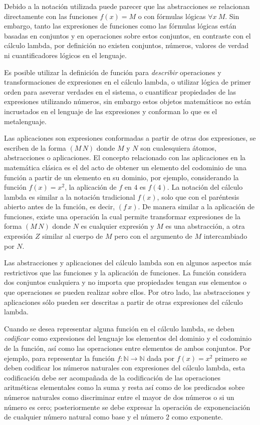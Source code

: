 Debido a la notación utilizada puede parecer que las abstracciones se relacionan directamente con las funciones \( f(x)=M \) o con fórmulas lógicas \( \forall x\ M \). Sin embargo, tanto las expresiones de funciones como las fórmulas lógicas están basadas en conjuntos y en operaciones sobre estos conjuntos, en contraste con el cálculo lambda, por definición no existen conjuntos, números, valores de verdad ni cuantificadores lógicos en el lenguaje.

Es posible utilizar la definición de función para \emph{describir} operaciones y transformaciones de expresiones en el cálculo lambda, o utilizar lógica de primer orden para aseverar verdades en el sistema, o cuantificar propiedades de las expresiones utilizando números, sin embargo estos objetos matemáticos no están incrustados en el lenguaje de las expresiones y conforman lo que es el metalenguaje.

Las aplicaciones son expresiones conformadas a partir de otras dos expresiones, se escriben de la forma \( (M\, N) \) donde \( M \) y \( N \) son cualesquiera átomos, abstracciones o aplicaciones. El concepto relacionado con las aplicaciones en la matemática clásica es el del acto de obtener un elemento del codominio de una función a partir de un elemento en su dominio, por ejemplo, considerando la función \( f(x)=x^{2} \), la aplicación de \( f \) en \( 4 \) es \( f(4) \).  La notación del cálculo lambda es similar a la notación tradicional \( f(x) \), solo que con el paréntesis abierto antes de la función, es decir, \( (f\, x) \). De manera similar a la aplicación de funciones, existe una operación la cual permite transformar expresiones de la forma \( (M\, N) \) donde \( N \) es cualquier expresión y \( M \) es una abstracción, a otra expresión \( Z \) similar al cuerpo de \( M \) pero con el argumento de \( M \) intercambiado por \( N \).

Las abstracciones y aplicaciones del cálculo lambda son en algunos aspectos más restrictivos que las funciones y la aplicación de funciones. La función considera dos conjuntos cualquiera y no importa que propiedades tengan sus elementos o que operaciones se pueden realizar sobre ellos. Por otro lado, las abstracciones y aplicaciones sólo pueden ser descritas a partir de otras expresiones del cálculo lambda.

Cuando se desea representar alguna función en el cálculo lambda, se deben \emph{codificar} como expresiones del lenguaje los elementos del dominio y el codominio de la función, así como las operaciones entre elementos de ambos conjuntos. Por ejemplo, para representar la función \( f \colon \mathbb{N} \to \mathbb{N} \) dada por \( f(x)=x^{2} \) primero se deben codificar los números naturales con expresiones del cálculo lambda, esta codificación debe ser acompañada de la codificación de las operaciones aritméticas elementales como la suma y resta así como de los predicados sobre números naturales como discriminar entre el mayor de dos números o si un número es cero; posteriormente se debe expresar la operación de exponenciación de cualquier número natural como base y el número \( 2 \) como exponente.

